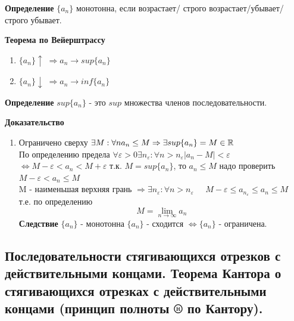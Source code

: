 \begin{tcolorbox}
    \textbf{Определение}
    $\{a_n\}$ монотонна, если возрастает/ строго возрастает/убывает/строго убывает.
\end{tcolorbox}

\begin{tcolorbox}
    \textbf{Теорема по Вейерштрассу}
    \begin{enumerate}
        \item $\{a_n\} \uparrow \; \Rightarrow a_n \to sup\{ a_n \}$
        \item $\{a_n\} \downarrow \; \Rightarrow a_n \to inf\{ a_n \}$
    \end{enumerate}
\end{tcolorbox}

\begin{tcolorbox}
    \textbf{Определение}
    $sup \{a_n\}$ - это $sup$ множества членов последовательности.
\end{tcolorbox}

\begin{tcolorbox}[title=Доказательство полноты $\R$ по Вейерштрассу]
    \textbf{Доказательство}
    \begin{enumerate}
        \item Ограничено сверху $\exists M: \forall n a_n \leq M \Rightarrow \exists sup\{a_n\} = M \in \mathbb{R}$\\
        По определению предела $\forall \varepsilon > 0 \exists n_\varepsilon: \forall n > n_\varepsilon |a_n - M| < \varepsilon $\\
        $\Leftrightarrow M-\varepsilon<a_n<M+\varepsilon$ т.к. $M=sup\{a_n\}$, то $a_n \leq M$ надо проверить $M-\varepsilon<a_n\leq M$\\
        M - наименьшая верхняя грань $\Rightarrow \exists n_\varepsilon: \forall n > n_\varepsilon \;\;\;\;\; M-\varepsilon \leq a_{n_\varepsilon} \leq a_n \leq M $\\
        т.е. по определению 
        \[M = \lim_{n\to\infty} a_n\]
        \textbf{Следствие} $\{a_n\}$ - монотонна $\{a_n\}$ - сходится $\Leftrightarrow \{a_n\}$ - ограничена.
    \end{enumerate}
\end{tcolorbox}


\subsection{Последовательности стягивающихся отрезков с действительными концами. Теорема Кантора о стягивающихся отрезках с действительными концами (принцип полноты ® по Кантору).}
